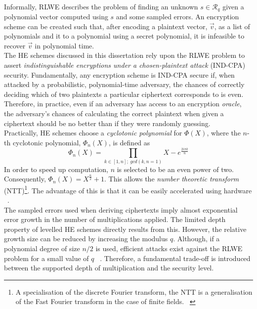 \smallskip \\ \indent
Informally, RLWE describes the problem of finding an unknown $s \in \mathcal{R}_q$ given a polynomial vector computed using $s$ and some sampled errors. An encryption scheme can be created such that, after encoding a plaintext vector, $\vec{v}$, as a list of polynomials and it to a polynomial using a secret polynomial, it is infeasible to recover $\vec{v}$ in polynomial time.
\smallskip \\ \indent
The HE schemes discussed in this dissertation rely upon the RLWE problem to assert \textit{indistinguishable encryptions under a chosen-plaintext attack} (IND-CPA) security. Fundamentally, any encryption scheme is IND-CPA secure if, when attacked by a probabilistic, polynomial-time adversary, the chances of correctly deciding which of two plaintexts a particular ciphertext corresponds to is even. Therefore, in practice, even if an adversary has access to an encryption \textit{oracle}, the adversary's chances of calculating the correct plaintext when given a ciphertext should be no better than if they were randomly guessing. 
\smallskip \\ \indent
Practically, HE schemes choose a \textit{cyclotonic polynomial} for $\Phi(X)$, where the $n$-th cyclotonic polynomial, $\Phi_n(X)$, is defined as
\begin{equation}
    \Phi_n(X) = \prod_{k \in [1, n]; \; gcd(k, n = 1)} X - e^\frac{2 i \pi k}{n}
\end{equation}
In order to speed up computation, $n$ is selected to be an even power of two. Consequently, $\Phi_n(X) = X^\frac{n}{2} + 1$. This allows the \textit{number theoretic transform} (NTT)\footnote{A specialisation of the discrete Fourier transform, the NTT is a generalisation of the Fast Fourier transform in the case of finite fields. ~\cite{NTT}}. The advantage of this is that it can be easily accelerated using hardware ~\cite{Hardware}.
\smallskip \\ \indent
The sampled errors used when deriving ciphertexts imply almost exponential error growth in the number of multiplications applied. The limited depth property of levelled HE schemes directly results from this. However, the relative growth size can be reduced by increasing the modulus $q$. Although, if a polynomial degree of size $n/2$ is used, efficient attacks exist against the RLWE problem for a small value of $q$ ~\cite{HEStandard}. Therefore, a fundamental trade-off is introduced between the supported depth of multiplication and the security level.





